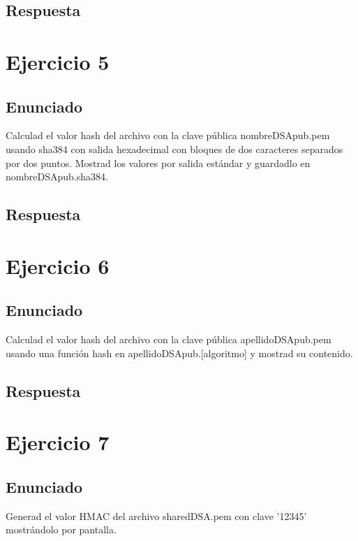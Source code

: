 \documentclass[10pt,a4paper,spanish]{report}
\begin{document}
\section{Respuesta}
\noindent

\chapter{Ejercicio 5}

\section{Enunciado}
\noindent
Calculad el valor hash del archivo con la clave pública nombreDSApub.pem usando sha384 con salida hexadecimal con bloques de dos caracteres separados por dos puntos. Mostrad los valores por salida estándar y guardadlo en nombreDSApub.sha384.

\section{Respuesta}
\noindent

\chapter{Ejercicio 6}

\section{Enunciado}
\noindent
Calculad el valor hash del archivo con la clave pública apellidoDSApub.pem usando una función hash en apellidoDSApub.[algoritmo] y mostrad su contenido.

\section{Respuesta}
\noindent

\chapter{Ejercicio 7}

\section{Enunciado}
\noindent
Generad el valor HMAC del archivo sharedDSA.pem con clave '12345' mostrándolo por pantalla.
\end{document}
